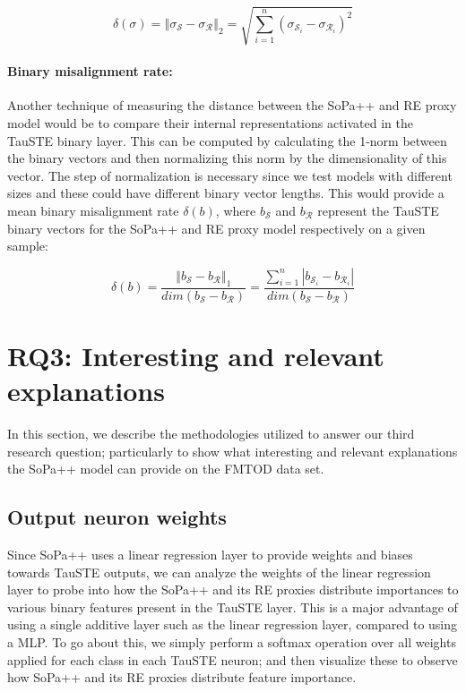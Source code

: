 \begin{equation}
  \delta(\sigma) = \left\Vert \sigma_{\mathcal{S}} - \sigma_{\mathcal{R}} \right\Vert_{2} = \sqrt{\sum^n_{i=1} (\sigma_{\mathcal{S}_i} - \sigma_{\mathcal{R}_i})^2} 
\end{equation}

\paragraph{Binary misalignment rate:} Another technique of measuring the
distance between the SoPa++ and RE proxy model would be to compare their
internal representations activated in the TauSTE binary layer. This can be
computed by calculating the 1-norm between the binary vectors and then
normalizing this norm by the dimensionality of this vector. The step of
normalization is necessary since we test models with different sizes and these
could have different binary vector lengths. This would provide a mean binary
misalignment rate $\delta(b)$, where $b_{\mathcal{S}}$ and $b_{\mathcal{R}}$
represent the TauSTE binary vectors for the SoPa++ and RE proxy model
respectively on a given sample:

\begin{equation}
  \delta(b) = \dfrac{\left\Vert b_{\mathcal{S}} - b_{\mathcal{R}} \right\Vert_{1}}{dim(b_{\mathcal{S}} - b_{\mathcal{R}})} = \dfrac{\sum^n_{i=1} |b_{\mathcal{S}_i} - b_{\mathcal{R}_i}|}{{dim(b_{\mathcal{S}} - b_{\mathcal{R}})}}
\end{equation}

\section{RQ3: Interesting and relevant explanations}

In this section, we describe the methodologies utilized to answer our third
research question; particularly to show what interesting and relevant
explanations the SoPa++ model can provide on the FMTOD data set.

\subsection{Output neuron weights}

Since SoPa++ uses a linear regression layer to provide weights and biases
towards TauSTE outputs, we can analyze the weights of the linear regression
layer to probe into how the SoPa++ and its RE proxies distribute importances to
various binary features present in the TauSTE layer. This is a major advantage
of using a single additive layer such as the linear regression layer, compared
to using a MLP. To go about this, we simply perform a softmax operation over all
weights applied for each class in each TauSTE neuron; and then visualize these
to observe how SoPa++ and its RE proxies distribute feature importance.

